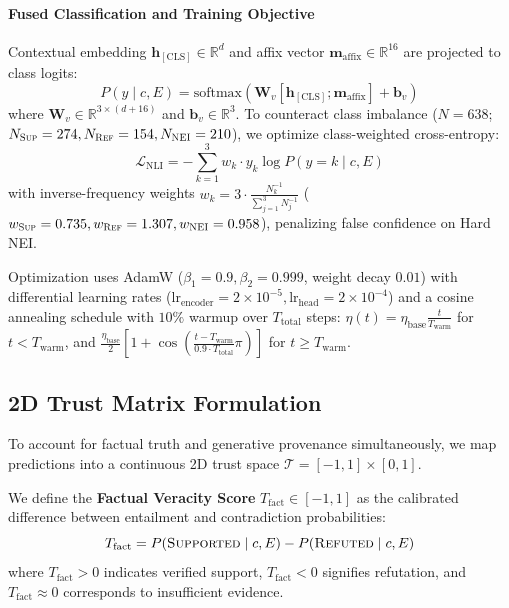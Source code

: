 \paragraph{Fused Classification and Training Objective}
Contextual embedding $\mathbf{h}_{[\text{CLS}]} \in \mathbb{R}^d$ and affix vector $\mathbf{m}_{\text{affix}} \in \mathbb{R}^{16}$ are projected to class logits:
\begin{equation}
\label{eq:nli_verifier}
P(y \mid c, E) = \mathrm{softmax}\left(\mathbf{W}_v \left[\mathbf{h}_{[\text{CLS}]}; \mathbf{m}_{\text{affix}}\right] + \mathbf{b}_v\right)
\end{equation}
where $\mathbf{W}_v \in \mathbb{R}^{3 \times (d + 16)}$ and $\mathbf{b}_v \in \mathbb{R}^3$. To counteract class imbalance ($N = 638$; $N_{\textsc{Sup}} = 274, N_{\textsc{Ref}} = 154, N_{\textsc{NEI}} = 210$), we optimize class-weighted cross-entropy:
\begin{equation}
\label{eq:class_weighted_loss}
\mathcal{L}_{\text{NLI}} = - \sum_{k=1}^3 w_k \cdot y_k \log P(y = k \mid c, E)
\end{equation}
with inverse-frequency weights $w_k = 3 \cdot \frac{N_k^{-1}}{\sum_{j=1}^3 N_j^{-1}}$ ($w_{\textsc{Sup}} = 0.735, w_{\textsc{Ref}} = 1.307, w_{\textsc{NEI}} = 0.958$), penalizing false confidence on Hard NEI.

Optimization uses AdamW ($\beta_1 = 0.9, \beta_2 = 0.999$, weight decay $0.01$) with differential learning rates ($\text{lr}_{\text{encoder}} = 2 \times 10^{-5}, \text{lr}_{\text{head}} = 2 \times 10^{-4}$) and a cosine annealing schedule with $10\%$ warmup over $T_{\text{total}}$ steps: $\eta(t) = \eta_{\text{base}} \frac{t}{T_{\text{warm}}}$ for $t < T_{\text{warm}}$, and $\frac{\eta_{\text{base}}}{2} [1 + \cos(\frac{t - T_{\text{warm}}}{0.9 \cdot T_{\text{total}}} \pi)]$ for $t \ge T_{\text{warm}}$.

\subsection{2D Trust Matrix Formulation}
To account for factual truth and generative provenance simultaneously, we map predictions into a continuous 2D trust space $\mathcal{T} = [-1, 1] \times [0, 1]$.

We define the \textbf{Factual Veracity Score} $T_{\text{fact}} \in [-1, 1]$ as the calibrated difference between entailment and contradiction probabilities:
\begin{equation}
\label{eq:trust_fact}
T_{\text{fact}} = P(\textsc{Supported} \mid c, E) - P(\textsc{Refuted} \mid c, E)
\end{equation}
where $T_{\text{fact}} > 0$ indicates verified support, $T_{\text{fact}} < 0$ signifies refutation, and $T_{\text{fact}} \approx 0$ corresponds to insufficient evidence.

